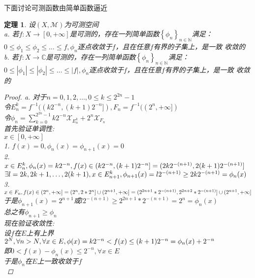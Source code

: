 \documentclass[12pt, a4paper, oneside]{ctexbook}
\newtheorem{theorem}{定理}[section]
\begin{document}
下面讨论可测函数由简单函数逼近
\begin{theorem}
    设$(X,\mathcal{M})$为可测空间\\
    a. 若$f:X\to[0,+\infty]$是可测的，存在一列简单函数$\left\{\phi_n\right\}_{n\in\mathbb{N}}$满足：\\
    $0\leq\phi_1\leq\phi_2\leq\dots\leq f,\phi_n$逐点收敛于$f$，且在任意$f$有界的子集上，是一致
    收敛的\\
    b. 若$f:X\to\mathbb{C}$是可测的，存在一列简单函数$\left\{\phi_n\right\}_{n\in\mathbb{N}}$满足：\\
    $0\leq|\phi_1|\leq|\phi_2|\leq\dots\leq |f|,\phi_n$逐点收敛于$f$，且在任意$f$有界的子集上，是一致
    收敛的
    \begin{proof}
        a. 
        对于$n=0,1,2,\dots,0\leq k\leq 2^{2n}-1$\\
        令$E_n^k=f^{-1}((k2^{-n},(k+1)2^{-n}]),F_n=f^{-1}((2^n,+\infty])$\\
        令$\phi_n=\sum_{k=0}^{2^{2n}-1}k2^{-n}\mathcal{X}_{E_n^k}+2^n\mathcal{X}_{F_n}$\\
        首先验证单调性:\\
        $x\in[0,+\infty]$\\
        1. $f(x)=0,\phi_n(x)=\phi_{n+1}(x)=0$\\
        2. $x\in E_n^k,\phi_n(x)=k2^{-n},\\
        f(x)\in(k2^{-n},(k+1)2^{-n}]=(2k2^{-(n+1)},2(k+1)2^{-(n+1)}]$\\
        $\exists l=2k,2k+1,\dots,2(k+1),x\in E_{n+1}^k,\\
        \phi_{n+1}(x)=l2^{-(n+1)}\geq 2k2^{-(n+1)}=\phi_n(x)$\\
        3. $x\in F_n,f(x)\in(2^n,+\infty]=(2^n,2*2^n]\cup(2^{n+1},+\infty]\\
        =(2^{2n+1}*2^{-(n+1)},2^{2n+2}*2^{-(n+1)}]\cup(2^{n+1},+\infty]$\\
        于是$\phi_{n+1}(x)=2^{n+1}$或$l2^{-(n+1)}\geq 2^{2n+1}*2^{-(n+1)}=2^n=\phi_n(x)$\\
        总之有$\phi_{n+1}\geq \phi_n$\\
        现在验证收敛性:\\
        设$f$在$E$上有上界$2^N,\forall n>N,\forall x\in E,\\
        \phi(x)=k2^{-n}<f(x)\leq (k+1)2^{-n}=\phi_n(x)+2^{-n}$\\
        即$0<f(x)-\phi_n(x)\leq 2^{-n},\forall x\in E$\\
        于是$\phi_n$在$E$上一致收敛于$f$\\

\end{proof}
\end{theorem}
\end{document}
